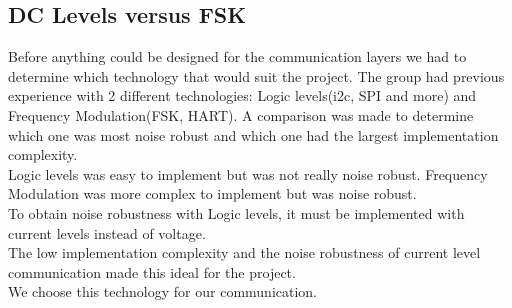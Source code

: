 \subsection{DC Levels versus FSK}
Before anything could be designed for the communication layers we had to determine which technology that would suit the project. The group had previous experience with 2 different technologies: Logic levels(i2c, SPI and more) and Frequency Modulation(FSK, HART). A comparison was made to determine which one was most noise robust and which one had the largest implementation complexity.\\
Logic levels was easy to implement but was not really noise robust. Frequency Modulation was more complex to implement but was noise robust.\\
To obtain noise robustness with Logic levels, it must be implemented with current levels instead of voltage.\\
The low implementation complexity and the noise robustness of  current level communication made this ideal for the project.\\
We choose this technology for our communication.
